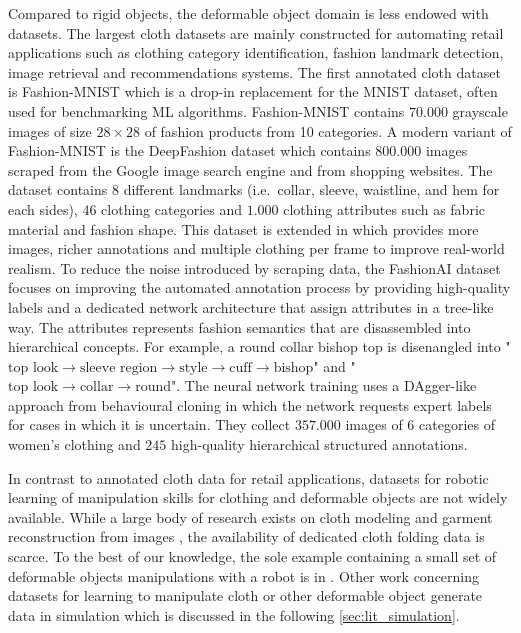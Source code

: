 \documentclass[\home/main.tex]{subfiles}
\begin{document}
Compared to rigid objects, the deformable object domain is less endowed with datasets. The largest cloth datasets are mainly constructed for automating retail applications such as clothing category identification, fashion landmark detection, image retrieval and recommendations systems. The first annotated cloth dataset is Fashion-MNIST \autocite{fashionmnist} which is a drop-in replacement for the MNIST dataset, often used for benchmarking ML algorithms. Fashion-MNIST contains $70.000$ grayscale images of size $28\times28$ of fashion products from 10 categories. A modern variant of Fashion-MNIST is the DeepFashion \autocite{DeepFashion} dataset which contains $800.000$ images scraped from the Google image search engine and from shopping websites. The dataset contains $8$ different landmarks (i.e.\ collar, sleeve, waistline, and hem for each sides), $46$ clothing categories and $1.000$ clothing attributes such as fabric material and fashion shape. This dataset is extended in \autocite{DeepFashion2} which provides more images, richer annotations and multiple clothing per frame to improve real-world realism. To reduce the noise introduced by scraping data, the FashionAI \autocite{FashionAI} dataset focuses on improving the automated annotation process by providing high-quality labels and a dedicated network architecture that assign attributes in a tree-like way. The attributes represents fashion semantics that are disassembled into hierarchical concepts. For example, a round collar bishop top is disenangled into "$\text{top look} \rightarrow \text{sleeve region} \rightarrow \text{style} \rightarrow \text{cuff} \rightarrow \text{bishop}$" and  "$\text{top look} \rightarrow \text{collar} \rightarrow \text{round}$". The neural network training uses a DAgger-like approach from behavioural cloning in which the network requests expert labels for cases in which it is uncertain. They collect $357.000$ images of $6$ categories of women's clothing and $245$ high-quality hierarchical structured annotations.

In contrast to annotated cloth data for retail applications, datasets for robotic learning of manipulation skills for clothing and deformable objects are not widely available. While a large body of research exists on cloth modeling and garment reconstruction from images \autocite{bertiche2020cloth3d,deepfashion3d,Wang20183dgarment}, the availability of dedicated cloth folding data is scarce. To the best of our knowledge, the sole example containing a small set of deformable objects manipulations with a robot is in \autocite{mandlekar2018roboturk}. Other work concerning datasets for learning to manipulate cloth or other deformable object generate data in simulation which is discussed in the following \cref{sec:lit_simulation}.
\end{document}
